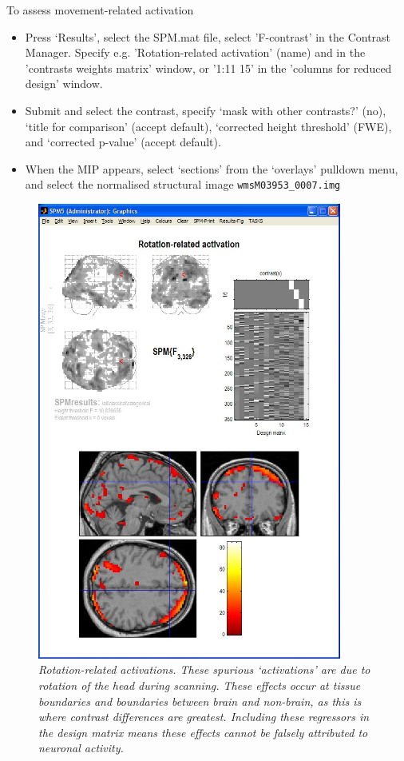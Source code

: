 \documentclass[a4paper,titlepage]{book}
\newcommand{\bi}{\begin{itemize}}
\newcommand{\ei}{\end{itemize}}
\begin{document}
To assess movement-related activation
\bi
\item{Press `Results', select the SPM.mat file, select 'F-contrast' in the Contrast Manager. Specify e.g. 'Rotation-related activation' (name) and 
in the 'contrasts weights matrix' window, or '1:11 15' in the 'columns for reduced design' window.} 
\item{
Submit and select the contrast, specify `mask with other contrasts?' (no), `title for comparison' (accept default), `corrected height threshold' (FWE), and `corrected p-value' (accept default).}
 \item{When the MIP appears, select `sections' from the `overlays' pulldown
 menu, and select the normalised structural image
 \verb!wmsM03953_0007.img!}
 \ei
\begin{figure}
\begin{center}
\includegraphics[width=100mm]{rotations}
\caption{\em Rotation-related activations. These spurious `activations' are due to rotation of the head during scanning. These effects occur at tissue boundaries and boundaries between brain and non-brain, as this is where contrast differences 
are greatest. Including these regressors in the design matrix means these effects cannot be falsely attributed 
to neuronal activity. \label{rotations} }
\end{center}
\end{figure}
\end{document}
